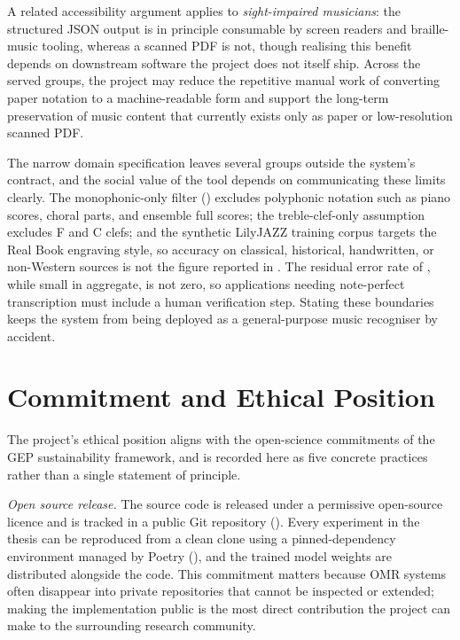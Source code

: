 A related accessibility argument applies to \emph{sight-impaired
musicians}: the structured JSON output is in principle consumable
by screen readers and braille-music tooling, whereas a scanned PDF
is not, though realising this benefit depends on downstream software
the project does not itself ship.
Across the served groups, the project may reduce the repetitive
manual work of converting paper notation to a machine-readable form
and support the long-term preservation of music content that
currently exists only as paper or low-resolution scanned PDF.

The narrow domain specification leaves several groups outside the
system's contract, and the social value of the tool depends on
communicating these limits clearly. The monophonic-only filter
() excludes polyphonic notation such as piano
scores, choral parts, and ensemble full scores; the treble-clef-only
assumption excludes F and C clefs; and the synthetic LilyJAZZ
training corpus targets the Real Book engraving style, so accuracy
on classical, historical, handwritten, or non-Western sources is not
the figure reported in . The residual error rate of
, while small in aggregate, is not zero, so
applications needing note-perfect transcription must include a human
verification step. Stating these boundaries keeps the system from
being deployed as a general-purpose music recogniser by accident.

\section{Commitment and Ethical Position}
\label{sec:sust-commitment}

The project's ethical position aligns with the open-science
commitments of the GEP sustainability framework, and is recorded
here as five concrete practices rather than a single statement of
principle.

\textit{Open source release.}
The source code is released under a permissive open-source
licence and is tracked in a public Git repository
().
Every experiment in the thesis can be reproduced from a clean
clone using a pinned-dependency environment managed by Poetry
(), and the trained model
weights are distributed alongside the code.
This commitment matters because OMR systems often disappear into
private repositories that cannot be inspected or extended; making
the implementation public is the most direct contribution the
project can make to the surrounding research community.

